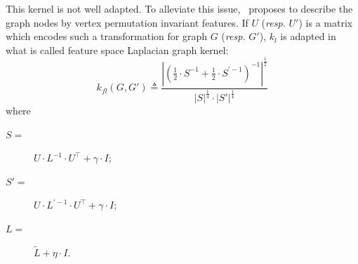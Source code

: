                     This kernel is not well adapted.
                    To alleviate this issue,~\textcite{kondor2016multiscale} proposes to describe the graph nodes by vertex permutation invariant features.
                    If $U$ (\textit{resp.} $U'$) is a matrix which encodes such a transformation for graph $G$ (\textit{resp.} $G'$), $k_{l}$ is adapted in what is called feature space Laplacian graph kernel:
                    \begin{equation}
                        \label{eq::feature_laplacian_kernel}
                        k_{fl}(G, G') \triangleq \frac{\left\lvert \left(\frac{1}{2} \cdot S^{-1} + \frac{1}{2} \cdot S^{\prime -1} \right)^{-1} \right\rvert^{\frac{1}{2}}}{\left\lvert S\right\rvert^{\frac{1}{4}}\cdot\left\lvert S' \right\rvert^{\frac{1}{4}}}
                    \end{equation}
                    where 
                    \begin{description}
                        \item[\(S =\)] \(U\cdot L^{-1}\cdot U^\intercal + \gamma \cdot I\);
                        \item[\(S' =\)] \(U\cdot L^{\prime -1}\cdot U^\intercal + \gamma \cdot I\);
                        \item[\(L = \)] \(\widetilde{L} + \eta \cdot I\).
                    \end{description}

